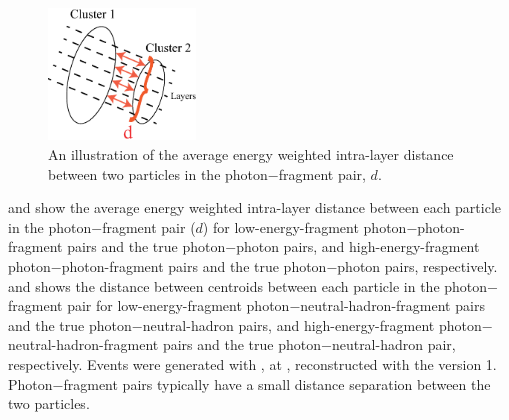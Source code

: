 \begin{figure}[tbph]
\centering
\includegraphics[width=0.35\textwidth]{photon/dLayer2}
\caption{An illustration of  the average energy weighted intra-layer distance between  two particles in the photon$-$fragment pair, $d$.}
\label{fig:photonDistanceMetric}
\end{figure}

 and  show the average energy weighted intra-layer distance between  each particle in the  photon$-$fragment pair ($d$) for  low-energy-fragment photon$-$photon-fragment pairs and the true photon$-$photon pairs, and high-energy-fragment photon$-$photon-fragment pairs and the true photon$-$photon pairs, respectively.  and  shows the distance between centroids between  each particle in the  photon$-$fragment pair for  low-energy-fragment photon$-$neutral-hadron-fragment pairs and the true photon$-$neutral-hadron pairs, and  high-energy-fragment photon$-$neutral-hadron-fragment pairs and the true photon$-$neutral-hadron pair, respectively. Events were generated with \eeZuds, at , reconstructed with the \pandora version 1.  Photon$-$fragment pairs typically have a small distance separation between the two particles.


